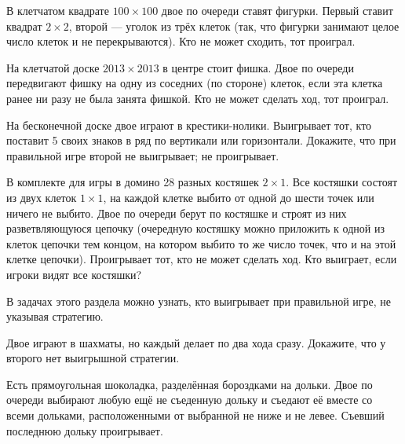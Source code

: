 \documentclass[a4paper,12pt]{article}
\begin{document}


В клетчатом квадрате $100\times100$ двое по
очереди ставят фигурки.
Первый ставит квадрат $2\times2$, второй
--- уголок из трёх клеток (так, что
фигурки занимают целое число клеток и не перекрываются).
Кто не может сходить, тот проиграл.

На клетчатой доске $2013\times2013$ в центре
стоит фишка. Двое по очереди передвигают фишку на одну из соседних
(по стороне) клеток, если эта клетка ранее ни разу не была занята
фишкой. Кто не может сделать ход, тот проиграл.

На бесконечной доске двое играют в крестики-нолики.
Выигрывает тот, кто поставит 5 своих знаков в ряд
по вертикали или горизонтали.
Докажите, что при правильной игре второй
 не выигрывает;
 не проигрывает.

В комплекте для игры в домино 28 разных костяшек $2\times1$.
Все костяшки состоят из двух клеток $1\times1$, на каждой клетке выбито от
одной до шести точек или ничего не выбито.
Двое по очереди берут по костяшке и строят из них разветвляющуюся цепочку
(очередную костяшку можно приложить к одной из клеток цепочки тем концом,
на котором выбито то же число точек, что и на этой клетке цепочки).
Проигрывает тот, кто не может сделать ход.
Кто выиграет, если игроки видят все костяшки?


{\small В задачах этого раздела можно узнать, кто выигрывает
при правильной игре, не указывая %
стратегию.} %

\vspace*{1truemm}

 Двое играют в шахматы, но каждый делает
по два хода сразу. Докажите, что у второго нет выигрышной стратегии.


Есть прямоугольная шоколадка, разделённая бороздками на дольки.
Двое по очереди выбирают любую ещё не съеденную дольку и съедают
её вместе со всеми дольками,
расположенными от выбранной не ниже и не левее.
Съевший последнюю дольку проигрывает.
\end{document}
